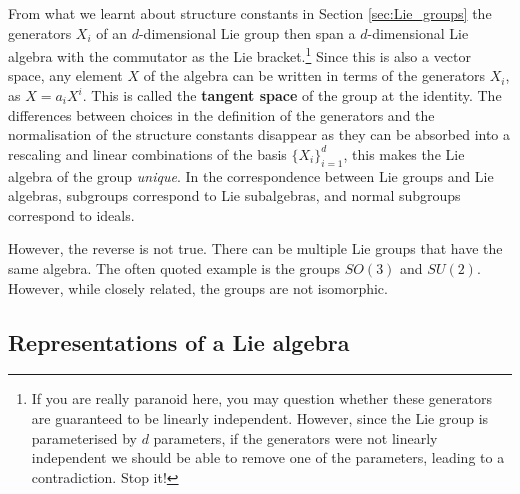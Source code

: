 \documentclass[notes.tex]{subfiles}
\begin{document}
From what we learnt about structure constants  in Section \ref{sec:Lie_groups} the generators $X_i$ of an $d$-dimensional Lie group then span a $d$-dimensional Lie algebra with the commutator as the Lie bracket.\footnote{If you are really paranoid here, you may question whether these generators are guaranteed to be linearly independent. However, since the Lie group is parameterised by $d$ parameters, if the generators were not linearly independent we should be able to remove one of the parameters, leading to a contradiction. Stop it!} Since this is also a vector space, any element $X$ of the algebra can be written in terms of the generators $X_i$, as $X=a_iX^i$. This is called the {\bf tangent space} of the group at the identity. The differences between choices in the definition of the generators and the normalisation of the structure constants disappear as they can be absorbed into a rescaling and linear combinations of the basis $\{X_i\}_{i=1}^d$, this makes the Lie algebra of the group {\it unique}. 
In the correspondence between Lie groups and Lie algebras, subgroups correspond to Lie subalgebras, and normal subgroups correspond to ideals. 

However, the reverse is not true. There can be multiple Lie groups that have the same algebra. The often quoted example is the groups $SO(3)$ and $SU(2)$. However, while closely related, the groups are not isomorphic. 


\subsection{Representations of a Lie algebra}
\label{sec:algebra_rep}
\end{document}
